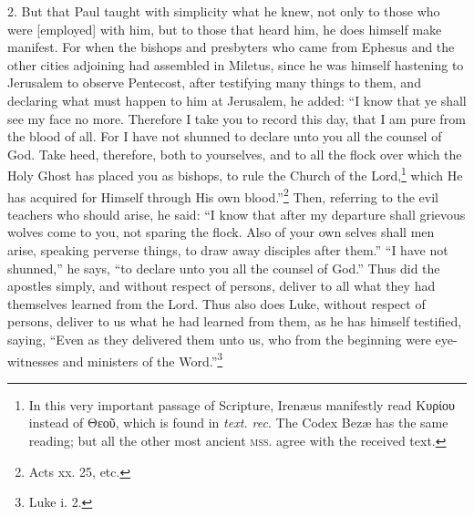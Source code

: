 2. But that Paul taught with simplicity what he knew, not only to those who were [employed] with him, but to those that heard him, he does himself make manifest. For when the bishops and presbyters who came from Ephesus and the other cities adjoining had assembled in Miletus, since he was himself hastening to Jerusalem to observe Pentecost, after testifying many things to them, and declaring what must happen to him at Jerusalem, he added: “I know that ye shall see my face no more. Therefore I take you to record this day, that I am pure from the blood of all. For I have not shunned to declare unto you all the counsel of God. Take heed, therefore, both to yourselves, and to all the flock over which the Holy Ghost has placed you as bishops, to rule the Church of the Lord,\footnote{In this very important passage of Scripture, Irenæus manifestly read \textgreek{Κυρίου} instead of \textgreek{Θεοῦ}, which is found in \emph{text. rec}. The Codex Bezæ has the same reading; but all the other most ancient \textsc{mss.} agree with the received text.} which He has acquired for Himself through His own blood.”\footnote{Acts xx. 25, etc.} Then, referring to the evil teachers who should arise, he said: “I know that after my departure shall grievous wolves come to you, not sparing the flock. Also of your own selves shall men arise, speaking perverse things, to draw away disciples after them.” “I have not shunned,” he says, “to declare unto you all the counsel of God.” Thus did the apostles simply, and without respect of persons, deliver to all what they had themselves learned from the Lord. Thus also does Luke, without respect of persons, deliver to us what he had learned from them, as he has himself testified, saying, “Even as they delivered them unto us, who from the beginning were eye-witnesses and ministers of the Word.”\footnote{Luke i. 2.}

